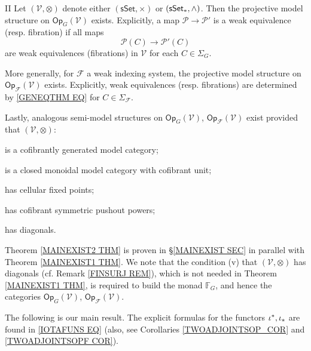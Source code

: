 \documentclass[a4paper,10pt
,draft
]{article}%
\numberwithin{equation}{section}
\numberwithin{figure}{section}
\theoremstyle{definition} %
\newcommand{\1}{\ensuremath{\mathbbm 1}}%
\begin{document}
\begin{customthm}{II}\label{MAINEXIST2 THM}
Let $(\mathcal{V},\otimes)$
denote either 
$(\mathsf{sSet}, \times)$
or
$(\mathsf{sSet}_{\**}, \wedge)$.
Then the projective model structure on 
$\mathsf{Op}_G(\mathcal{V})$ exists. Explicitly,
a map $\mathcal{P} \to \mathcal{P}'$ is a weak equivalence (resp. fibration) if all maps
\begin{equation}\label{GENEQTHM EQ}
\mathcal{P}(C)
	\to
\mathcal{P}'(C)
\end{equation}
are weak equivalences (fibrations) in $\mathcal{V}$
for each $C \in \Sigma_G$.

More generally, for $\mathcal{F}$ a weak indexing system, the projective model structure on 
$\mathsf{Op}_{\mathcal{F}}(\mathcal{V})$ exists. Explicitly, weak equivalences (resp. fibrations) are
determined by \eqref{GENEQTHM EQ}
for $C \in \Sigma_{\mathcal{F}}$.

Lastly, 
analogous 
semi-model structures on
$\mathsf{Op}_G(\mathcal{V})$,
$\mathsf{Op}_{\mathcal{F}}(\mathcal{V})$
exist
provided that
$(\mathcal{V},\otimes)$:
\begin{inparaenum}
\item[(i)] is a cofibrantly generated model category;
\item [(ii)] is a closed monoidal model category with cofibrant unit;
\item[(iii)] has cellular fixed points;
\item[(iv)] has cofibrant symmetric pushout powers;
\item[(v)] has diagonals.
\end{inparaenum}
\end{customthm}

Theorem \ref{MAINEXIST2 THM} is proven in 
\S \ref{MAINEXIST SEC}
in parallel with Theorem \ref{MAINEXIST1 THM}.
We note that the condition (v) that 
$(\mathcal{V},\otimes)$ has diagonals (cf. Remark \ref{FINSURJ REM}), which is not needed in 
Theorem \ref{MAINEXIST1 THM}, is required to build
the monad $\mathbb F_G$, and hence the categories
$\mathsf{Op}_G(\mathcal{V})$,
$\mathsf{Op}_{\mathcal{F}}(\mathcal{V})$.

The following is our main result.
The explicit formulas for
the functors 
$\iota^{\**},\iota_{\**}$
are found in \eqref{IOTAFUNS EQ}
(also, see Corollaries \ref{TWOADJOINTSOP_COR}
and \ref{TWOADJOINTSOPF COR}).
\end{document}
